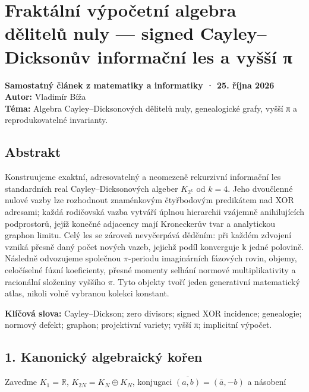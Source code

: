 \documentclass[
  10pt,
]{article}
\author{}
\date{}
\begin{document}
{
\setcounter{tocdepth}{3}
\tableofcontents
}
\section{Fraktální výpočetní algebra dělitelů nuly --- signed
Cayley--Dicksonův informační les a vyšší
π}\label{fraktuxe1lnuxed-vuxfdpoux10detnuxed-algebra-dux11blitelux16f-nuly-signed-cayleydicksonux16fv-informaux10dnuxed-les-a-vyux161ux161uxed-ux3c0}

\textbf{Samostatný článek z matematiky a informatiky · 25. října 2026}\\
\textbf{Autor:} Vladimír Bíža\\
\textbf{Téma:} Algebra Cayley--Dicksonových dělitelů nuly, genealogické
grafy, vyšší π a reprodukovatelné invarianty.

\subsection{Abstrakt}\label{abstrakt}

Konstruujeme exaktní, adresovatelný a neomezeně rekurzivní informační
les standardních real Cayley--Dicksonových algeber \(K_{2^k}\) od
\(k=4\). Jeho dvoučlenné nulové vazby lze rozhodnout znaménkovým
čtyřbodovým predikátem nad XOR adresami; každá rodičovská vazba vytváří
úplnou hierarchii vzájemně anihilujících podprostorů, jejíž konečné
adjacency mají Kroneckerův tvar a analytickou graphon limitu. Celý les
se zároveň nevyčerpává děděním: při každém zdvojení vzniká přesně daný
počet nových vazeb, jejichž podíl konverguje k jedné polovině. Následně
odvozujeme společnou \(\pi\)-periodu imaginárních fázových rovin,
objemy, celočíselné fúzní koeficienty, přesné momenty selhání normové
multiplikativity a racionální složeniny vyššího \(\pi\). Tyto objekty
tvoří jeden generativní matematický atlas, nikoli volně vybranou kolekci
konstant.

\textbf{Klíčová slova:} Cayley--Dickson; zero divisors; signed XOR
incidence; genealogie; normový defekt; graphon; projektivní variety;
vyšší π; implicitní výpočet.

\subsection{1. Kanonický algebraický
kořen}\label{kanonickuxfd-algebraickuxfd-koux159en}

Zaveďme \(K_1=\mathbb R\), \(K_{2N}=K_N\oplus K_N\), konjugaci
\(\overline{(a,b)}=(\bar a,-b)\) a násobení
\end{document}
